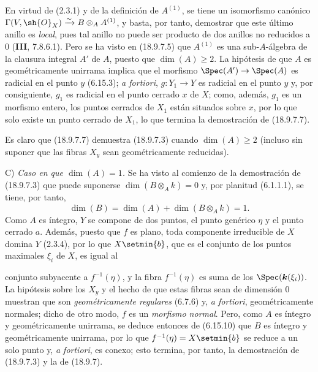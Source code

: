 En virtud de (2.3.1) y de la definición de $A^{(1)}$, se tiene un isomorfismo canónico $\Gamma(V,\sh{O}_X)\xrightarrow{\sim}B\otimes_A A^{(1)}$, y basta, por tanto, demostrar que este último anillo es \emph{local}, pues tal anillo no puede ser producto de dos anillos no reducidos a 0 (\textbf{III}, 7.8.6.1). Pero se ha visto en (18.9.7.5) que $A^{(1)}$ es una sub-$A$-álgebra de la clausura integral $A'$ de $A$, puesto que $\dim(A)\geq 2$. La hipótesis de que $A$ es geométricamente unirrama implica que el morfismo $\Spec(A')\to\Spec(A)$ es radicial en el punto $y$ (6.15.3); \emph{a fortiori}, $g:Y_1\to Y$ es radicial en el punto $y$ y, por consiguiente, $g_1$ es radicial en el punto cerrado $x$ de $X$; como, además, $g_1$ es un morfismo entero, los puntos cerrados de $X_1$ están situados sobre $x$, por lo que solo existe un punto cerrado de $X_1$, lo que termina la demostración de (18.9.7.7).

Es claro que (18.9.7.7) demuestra (18.9.7.3) cuando $\dim(A)\geq 2$ (incluso sin suponer que las fibras $X_y$ sean geométricamente reducidas).

C) \emph{Caso en que $\dim(A)=1$.} Se ha visto al comienzo de la demostración de (18.9.7.3) que puede suponerse $\dim(B\otimes_A k)=0$ y, por planitud (6.1.1.1), se tiene, por tanto,
\[
  \dim(B)=\dim(A)+\dim(B\otimes_A k)=1.
\]
Como $A$ es íntegro, $Y$ se compone de dos puntos, el punto genérico $\eta$ y el punto cerrado $a$. Además, puesto que $f$ es plano, toda componente irreducible de $X$ domina $Y$ (2.3.4), por lo que $X\setmin\{b\}$, que es el conjunto de los puntos maximales $\xi_i$ de $X$, es igual al


conjunto subyacente a $f^{-1}(\eta)$, y la fibra $f^{-1}(\eta)$ es suma de los $\Spec(\boldsymbol{k}(\xi_i))$. La hipótesis sobre los $X_y$ y el hecho de que estas fibras sean de dimensión 0 muestran que son \emph{geométricamente regulares} (6.7.6) y, \emph{a fortiori}, geométricamente normales; dicho de otro modo, $f$ es un \emph{morfismo normal}. Pero, como $A$ es íntegro y geométricamente unirrama, se deduce entonces de (6.15.10) que $B$ es íntegro y geométricamente unirrama, por lo que $f^{-1}(\eta)=X\setmin\{b\}$ se reduce a un solo punto y, \emph{a fortiori}, es conexo; esto termina, por tanto, la demostración de (18.9.7.3) y la de (18.9.7).


